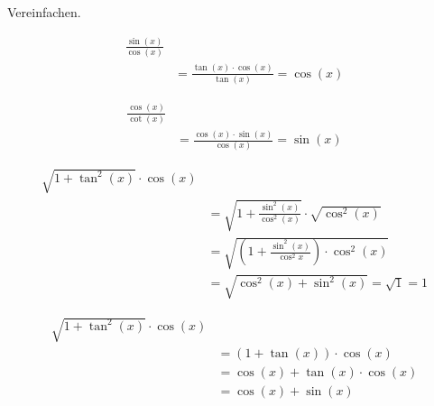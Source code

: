 \begin{uebung}
	Vereinfachen.

	\begin{align*}
		\frac{\sin(x)}{\cos(x)}                              \\
		 & = \frac{\tan(x) \cdot \cos(x)}{\tan(x)} = \cos(x)
	\end{align*}

	\begin{align*}
		\frac{\cos(x)}{\cot(x)}                              \\
		 & = \frac{\cos(x) \cdot \sin(x)}{\cos(x)} = \sin(x)
	\end{align*}

	\begin{align*}
		\sqrt{1+ \tan^2(x)} \cdot \cos(x)                                         \\
		 & = \sqrt{1 + \frac{\sin^2(x)}{\cos^2(x)}} \cdot \sqrt{\cos^2(x)}        \\
		 & = \sqrt{\left(1 + \frac{\sin^2(x)}{\cos^2{x}} \right) \cdot \cos^2(x)} \\
		 & = \sqrt{\cos^2(x) + \sin^2(x)} = \sqrt{1} = 1
	\end{align*}

	\begin{align*}
		\sqrt{1 + \tan^2(x)} \cdot \cos(x)   \\
		 & = (1 + \tan(x)) \cdot \cos(x)     \\
		 & = \cos(x) + \tan(x) \cdot \cos(x) \\
		 & = \cos(x) + \sin(x)
	\end{align*}

\end{uebung}
